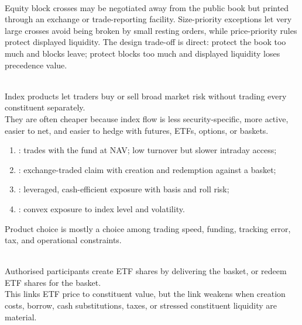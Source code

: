 \documentclass[a4paper,oneside,openany]{book}
\begin{document}
\begin{marketrule} \\
Equity block crosses may be negotiated away from the public book but printed through an exchange or trade-reporting facility. Size-priority exceptions let very large crosses avoid being broken by small resting orders, while price-priority rules protect displayed liquidity. The design trade-off is direct: protect the book too much and blocks leave; protect blocks too much and displayed liquidity loses precedence value.
\end{marketrule}

\begin{principle} \\
Index products let traders buy or sell broad market risk without trading every constituent separately.\\
They are often cheaper because index flow is less security-specific, more active, easier to net, and easier to hedge with futures, ETFs, options, or baskets.
\end{principle}

\begin{taxonomy} 
\begin{enumerate}[label=\roman*.]
\setlength{\itemsep}{0pt}
\item {}: trades with the fund at NAV; low turnover but slower intraday access;
\item {}: exchange-traded claim with creation and redemption against a basket;
\item {}: leveraged, cash-efficient exposure with basis and roll risk;
\item {}: convex exposure to index level and volatility.
\end{enumerate}
Product choice is mostly a choice among trading speed, funding, tracking error, tax, and operational constraints.
\end{taxonomy}

\begin{mechanism} \\
Authorised participants create ETF shares by delivering the basket, or redeem ETF shares for the basket.\\
This links ETF price to constituent value, but the link weakens when creation costs, borrow, cash substitutions, taxes, or stressed constituent liquidity are material.
\end{mechanism}
\end{document}
